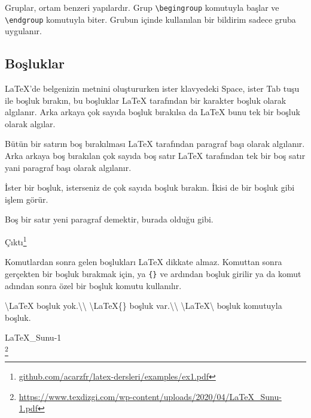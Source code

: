 \documentclass[
  10pt,
]{scrbook}
\newenvironment{Shaded}{\begin{snugshade}}{\end{snugshade}}
\newcommand{\NormalTok}[1]{#1}
\renewcommand{\href}[2]{#2\footnote{\url{#1}}}
\begin{document}
Gruplar, ortam benzeri yapılardır. Grup \texttt{\textbackslash{}begingroup} komutuyla başlar
ve \texttt{\textbackslash{}endgroup} komutuyla biter. Grubun içinde kullanılan bir bildirim
sadece gruba uygulanır.

\hypertarget{boux15fluklar}{%
\subsection{Boşluklar}\label{boux15fluklar}}

LaTeX'de belgenizin metnini oluştururken ister klavyedeki Space, ister
Tab tuşu ile boşluk bırakın, bu boşluklar LaTeX tarafından bir karakter
boşluk olarak algılanır. Arka arkaya çok sayıda boşluk bırakılsa da
LaTeX bunu tek bir boşluk olarak algılar.

Bütün bir satırın boş bırakılması LaTeX tarafından paragraf başı olarak
algılanır. Arka arkaya boş bırakılan çok sayıda boş satır LaTeX
tarafından tek bir boş satır yani paragraf başı olarak algılanır.

\begin{Shaded}
\begin{Highlighting}[]
\NormalTok{ İster bir boşluk, isterseniz de çok         sayıda boşluk bırakın. }
\NormalTok{İkisi de bir boşluk gibi işlem görür. }

\NormalTok{Boş bir satır yeni paragraf demektir, burada olduğu gibi.}
\end{Highlighting}
\end{Shaded}

\href{github.com/acarzfr/latex-dersleri/examples/ex1.pdf}{Çıktı}

Komutlardan sonra gelen boşlukları LaTeX dikkate almaz. Komuttan sonra
gerçekten bir boşluk bırakmak için, ya \texttt{\{\}} ve ardından boşluk girilir
ya da komut adından sonra özel bir boşluk komutu kullanılır.

\begin{Shaded}
\begin{Highlighting}[]
\NormalTok{\textbackslash{}LaTeX  boşluk yok.\textbackslash{}\textbackslash{}}
\NormalTok{\textbackslash{}LaTeX\{\} boşluk var.\textbackslash{}\textbackslash{}}
\NormalTok{\textbackslash{}LaTeX\textbackslash{} boşluk komutuyla  boşluk.}
\end{Highlighting}
\end{Shaded}

\href{https://www.texdizgi.com/wp-content/uploads/2020/04/LaTeX_Sunu-1.pdf}{LaTeX\_Sunu-1\\
}
\end{document}
